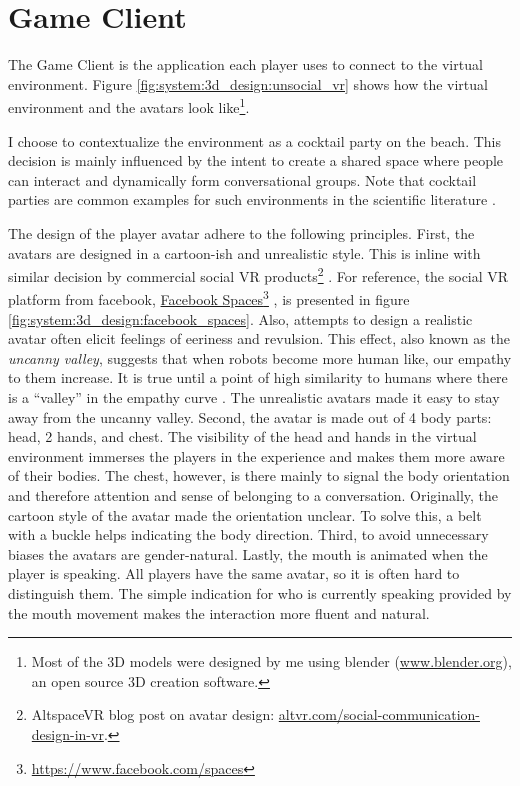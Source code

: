\documentclass[]{simple-thesis}
\newcommand\fnurl[2]{%
  \href{#2}{#1}\footnote{\url{#2}}%
}
\begin{document}
\section{Game Client}

The Game Client is the application each player uses to connect to the virtual environment.
Figure \ref{fig:system:3d_design:unsocial_vr} shows how the virtual environment and the avatars look like\footnote{Most of the 3D models were designed by me using blender (\href{https://www.blender.org/}{www.blender.org}), an open source 3D creation software.}.

I choose to contextualize the environment as a cocktail party on the beach.
This decision is mainly influenced by the intent to create a shared space where people can interact and dynamically form conversational groups.
Note that cocktail parties are common examples for such environments in the scientific literature \citep{Setti2015}.

The design of the player avatar adhere to the following principles.
First, the avatars are designed in a cartoon-ish and unrealistic style.
This is inline with similar decision by commercial social VR products\footnote{AltspaceVR blog post on avatar design: \href{https://altvr.com/social-communication-design-in-vr/}{altvr.com/social-communication-design-in-vr}.} \citep{Ghosh2017, Pot2016}.
For reference, the social VR platform from facebook, \fnurl{Facebook Spaces}{https://www.facebook.com/spaces}, is presented in figure \ref{fig:system:3d_design:facebook_spaces}.
Also, attempts to design a realistic avatar often elicit feelings of eeriness and revulsion.
This effect, also known as the \textit{uncanny valley}, suggests that when robots become more human like, our empathy to them increase.
It is true until a point of high similarity to humans where there is a ``valley'' in the empathy curve \citep{Mori1970}.
The unrealistic avatars made it easy to stay away from the uncanny valley.
Second, the avatar is made out of 4 body parts: head, 2 hands, and chest.
The visibility of the head and hands in the virtual environment immerses the players in the experience and makes them more aware of their bodies.
The chest, however, is there mainly to signal the body orientation and therefore attention and sense of belonging to a conversation.
Originally, the cartoon style of the avatar made the orientation unclear.
To solve this, a belt with a buckle helps indicating the body direction.
Third, to avoid unnecessary biases the avatars are gender-natural.
Lastly, the mouth is animated when the player is speaking.
All players have the same avatar, so it is often hard to distinguish them.
The simple indication for who is currently speaking provided by the mouth movement makes the interaction more fluent and natural.
\end{document}
